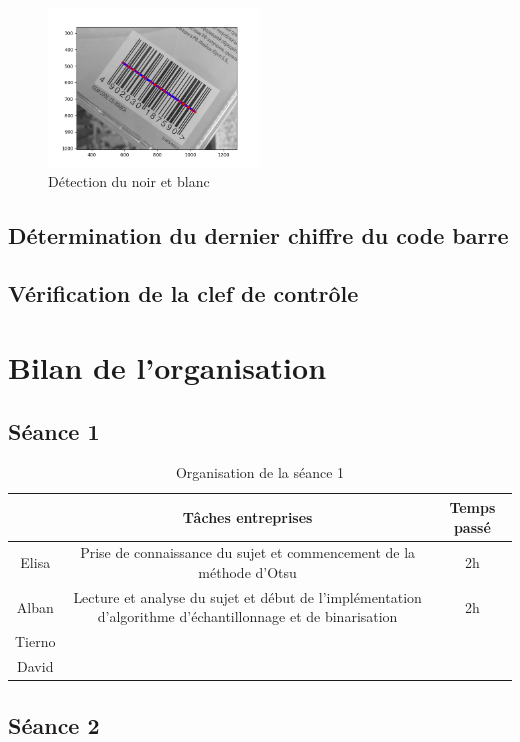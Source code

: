 \documentclass{rapport}
\begin{document}
\begin{figure}[H] 
	\centering
	\includegraphics[width=0.5\textwidth]{images/detection.png}
	\caption{Détection du noir et blanc}
	\label{fig:detection}
\end{figure}


\subsection{Détermination du dernier chiffre du code barre}

\subsection{Vérification de la clef de contrôle}

\section{Bilan de l'organisation}

\subsection{Séance 1}

\begin{table}[H]
	\centering 
	\begin{tabular}{c|c|c}
		& Tâches entreprises& Temps passé\\ \hline
		Elisa& Prise de connaissance du sujet et commencement de la méthode d'Otsu& 2h\\ \hline
		Alban& Lecture et analyse du sujet et début de l'implémentation d'algorithme d'échantillonnage et de binarisation& 2h\\ \hline
		Tierno& & \\ \hline
		David& & 
	\end{tabular}
	\caption{Organisation de la séance 1}
\end{table}

\subsection{Séance 2}
\end{document}
